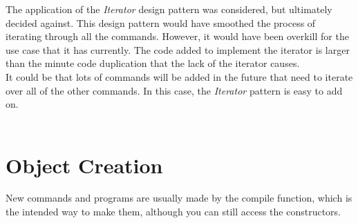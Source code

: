 The application of the \textit{Iterator} design pattern was considered, but ultimately decided against. This design pattern would have smoothed the process of iterating through all the commands. However, it would have been overkill for the use case that it has currently. The code added to implement the iterator is larger than the minute code duplication that the lack of the iterator causes. \\
It could be that lots of commands will be added in the future that need to iterate over all of the other commands. In this case, the \textit{Iterator} pattern is easy to add on.\\~\\

\section{Object Creation}
New commands and programs are usually made by the compile function, which is the intended way to make them, although you can still access the constructors. 

